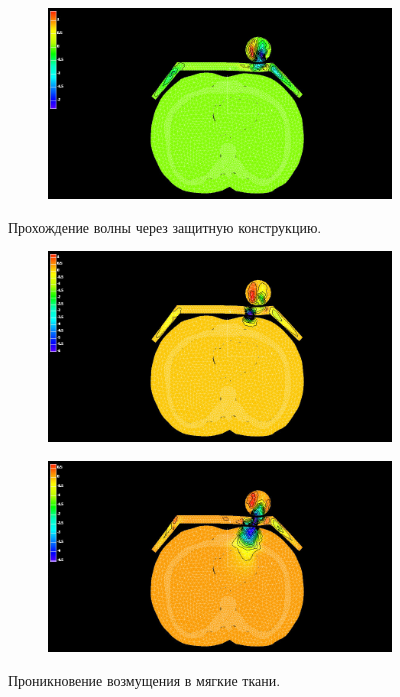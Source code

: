 \begin{figure}[h]
\centering
\begin{subfigure}[b]{0.9\textwidth}
\centering
\includegraphics[width=\textwidth]{png/cranium/chest-res-01.png}
\end{subfigure}
\caption{Прохождение волны через защитную конструкцию.}
\end{figure}


\begin{figure}[h]
\centering
\begin{subfigure}[b]{0.9\textwidth}
\centering
\includegraphics[width=\textwidth]{png/cranium/chest-res-02.png}
\caption{ }
\end{subfigure}
\begin{subfigure}[b]{0.9\textwidth}
\centering
\includegraphics[width=\textwidth]{png/cranium/chest-res-03.png}
\caption{ }
\end{subfigure}
\caption{Проникновение возмущения в мягкие ткани.}
\end{figure}


